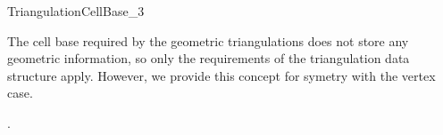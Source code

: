 

\begin{ccRefConcept}{TriangulationCellBase_3}


\ccDefinition

The cell base required by the geometric triangulations does not store any
geometric information, so only the requirements of the triangulation data
structure apply.  However, we provide this concept for symetry with the
vertex case.


\ccHasModels

.

\ccSeeAlso




\end{ccRefConcept}


